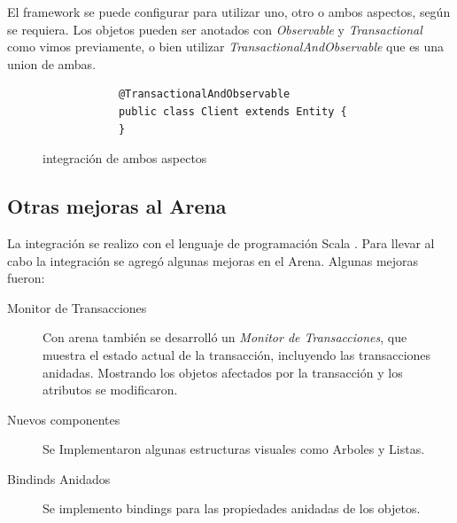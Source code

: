 	El framework se puede configurar para utilizar uno, otro o ambos
	aspectos, según se requiera.
	Los objetos pueden ser anotados con \emph{Observable} y
	\emph{Transactional} como vimos previamente, 
	o bien utilizar \emph{TransactionalAndObservable} que es una union de ambas.
	
	\begin{figure}[h]
		\begin{lstlisting} 
			@TransactionalAndObservable
			public class Client extends Entity {
			}
		\end{lstlisting}
		\caption{integración de ambos aspectos}
		\label{TandO}
	\end{figure}  
	
	\subsection{Otras mejoras al Arena}
	La integración se realizo con el lenguaje de programación Scala
	\cite{ref}. Para llevar al cabo la integración se agregó algunas
	mejoras en el Arena. 
	Algunas mejoras fueron:
	\begin{description}
	  \item[Monitor de Transacciones]
		 Con arena también se desarrolló un \emph{Monitor de Transacciones}, que 
		 muestra el estado actual de la transacción, incluyendo las transacciones
		 anidadas. Mostrando los objetos afectados por la transacción y los
		 atributos se modificaron.
	  \item[Nuevos componentes] Se Implementaron algunas estructuras visuales como
	  Arboles y Listas.
	  \item[Bindinds Anidados] Se implemento bindings para las propiedades
	  anidadas de los objetos.
	\end{description}
